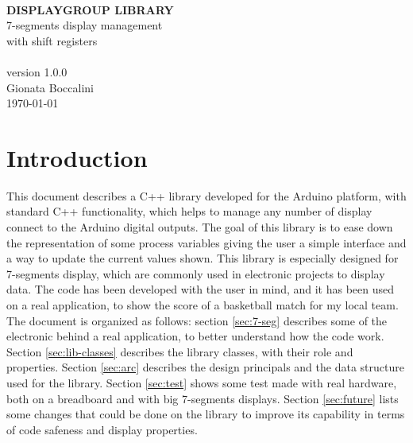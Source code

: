 \documentclass[11pt,english]{article}
\begin{document}
\begin{titlepage}
\begin{center} 

~\\[3.5cm] 

\textbf{{\Huge DISPLAYGROUP LIBRARY}
~\\[0.7cm]}
\LARGE{7-segments display management \\
with shift registers \\
~\\[0.1cm]
version 1.0.0}
~\\[3cm]
\normalsize Gionata Boccalini
~\\[0.5cm]
\normalsize \today

\end{center} 
\vspace*{6cm}
\end{titlepage}


\newpage{}

\tableofcontents{}


\listoffigures

\lstlistoflistings

\newpage{}



\section{Introduction}

This document describes a C++ library developed for the Arduino platform, with standard 
C++ functionality, which helps to manage any number of display connect to the Arduino 
digital outputs.
The goal of this library is to ease down the representation of some process variables 
giving the user a simple interface and a way to update the current values shown. This 
library is especially designed for 7-segments display, which are commonly used in 
electronic projects to display data.
The code has been developed with the user in mind, and it has been used on a real 
application, to show the score of a basketball match for my local team.
The document is organized as follows: section \ref{sec:7-seg} describes some of the 
electronic behind a real application, to better understand how the code work.
Section \ref{sec:lib-classes} describes the library classes, with their role and 
properties.
Section \ref{sec:arc} describes the design principals and the data structure used 
for the library. Section \ref{sec:test} shows some test made with real hardware, both 
on a breadboard and with big 7-segments displays. Section \ref{sec:future} lists some 
changes that could be done on the library to improve its capability in terms of 
code safeness and display properties.
\end{document}
